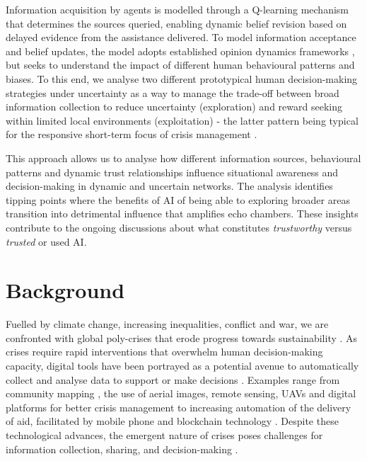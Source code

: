 \documentclass[pdflatex,sn-apa]{sn-jnl}%
\begin{document}
Information acquisition by agents is modelled through a Q-learning mechanism that determines the sources queried, enabling dynamic belief revision based on delayed evidence from the assistance delivered. To model information acceptance and belief updates, the model adopts established opinion dynamics frameworks \citep{geschke2019triple}, but seeks to understand the impact of different human behavioural patterns and biases. To this end, we analyse two different prototypical human decision-making strategies under uncertainty as a way to manage the trade-off between broad information collection to reduce uncertainty (exploration) and reward seeking within limited local environments (exploitation) - the latter pattern being typical for the responsive short-term focus of crisis management \citep{comes2020coordination}. 

This approach allows us to analyse how different information sources, behavioural patterns and dynamic trust relationships influence situational awareness and decision-making in dynamic and uncertain networks. The analysis identifies tipping points where the benefits of AI of being able to exploring broader areas transition into detrimental influence that amplifies echo chambers. These insights contribute to the ongoing discussions about what constitutes \textit{trustworthy} versus \textit{trusted} or used AI. 

\section{Background}

Fuelled by climate change, increasing inequalities, conflict and war, we are confronted with global poly-crises that erode progress towards sustainability \citep{sogaard2024evolution}. As crises require rapid interventions that overwhelm human decision-making capacity, digital tools have been portrayed as a potential avenue to automatically collect and analyse data to support or make decisions \citep{qadir2016crisis}. Examples range from community mapping \citep{champlin2023measuring, soden2014crowdsourced}, the use of aerial images, remote sensing, UAVs and digital platforms for better crisis management \citep{voigt2007satellite} to increasing automation of the delivery of aid, facilitated by mobile phone and blockchain technology \citep{coughlan2015forecast, baharmand2019leveraging}. Despite these technological advances, the emergent nature of crises poses challenges for information collection, sharing, and decision-making \citep{turoff2004design, nespeca2020towards}.
\end{document}
